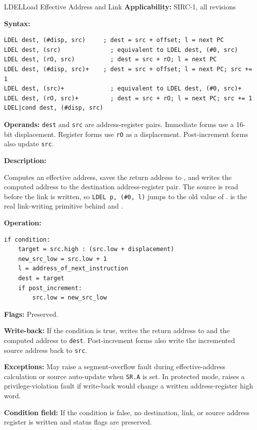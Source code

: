 \begin{instructionbox}{LDEL}{Load Effective Address and Link}
	\textbf{Applicability:} SIRC-1, all revisions

	\textbf{Syntax:}
	\begin{lstlisting}
LDEL dest, (#disp, src)     ; dest = src + offset; l = next PC
LDEL dest, (src)              ; equivalent to LDEL dest, (#0, src)
LDEL dest, (rO, src)          ; dest = src + rO; l = next PC
LDEL dest, (#disp, src)+    ; dest = src + offset; l = next PC; src += 1
LDEL dest, (src)+             ; equivalent to LDEL dest, (#0, src)+
LDEL dest, (rO, src)+         ; dest = src + rO; l = next PC; src += 1
LDEL|cond dest, (#disp, src)
\end{lstlisting}

	\textbf{Operands:} \texttt{dest} and \texttt{src} are address-register pairs. Immediate forms use a 16-bit
	displacement. Register forms use \texttt{rO} as a displacement. Post-increment forms also update \texttt{src}.

	\textbf{Description:}

	Computes an effective address, saves the return address to , and writes the computed address to the destination
	address-register pair. The source is read before the link is written, so \texttt{LDEL p, (\#0, l)} jumps to the old
	value of .  is the real link-writing primitive behind  and .

	\textbf{Operation:}
	\begin{verbatim}
if condition:
    target = src.high : (src.low + displacement)
    new_src_low = src.low + 1
    l = address_of_next_instruction
    dest = target
    if post_increment:
        src.low = new_src_low
\end{verbatim}

	\textbf{Flags:} Preserved.

	\textbf{Write-back:} If the condition is true, writes the return address to  and the computed address to
	\texttt{dest}. Post-increment forms also write the incremented source address back to \texttt{src}.

	\textbf{Exceptions:} May raise a segment-overflow fault during effective-address calculation or source auto-update when
	\texttt{SR.A} is set. In protected mode, raises a privilege-violation fault if write-back would change a written address-register high word.

	\textbf{Condition field:} If the condition is false, no destination, link, or source address register is written and
	status flags are preserved.


\end{instructionbox}
